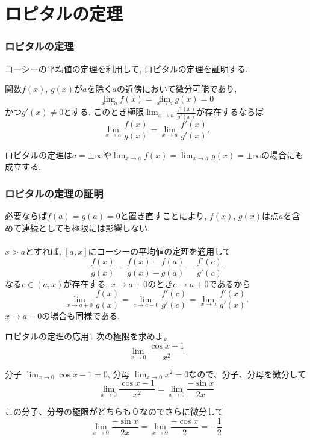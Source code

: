 \section{ロピタルの定理}

\begin{frame}
\frametitle{ロピタルの定理}

コーシーの平均値の定理を利用して, ロピタルの定理を証明する. 

\begin{Thm}[ロピタルの定理]
関数$f(x)$, $g(x)$が$a$を除く$a$の近傍において微分可能であり, 
$$
\lim_{x\to a}f(x) = \lim_{x\to a}g(x)=0
$$
かつ$g'(x) \ne0$とする. このとき極限$\displaystyle \lim_{x\to a}\frac{f'(x)}{g'(x)}$が存在するならば
$$
\lim_{x\to a}\frac{f(x)}{g(x)} = \lim_{x\to a}\frac{f'(x)}{g'(x)}. 
$$
\end{Thm}

ロピタルの定理は$a=\pm \infty$や$\displaystyle \lim_{x\to a}f(x) = \lim_{x\to a}g(x)=\pm \infty$の場合にも成立する. 

\end{frame}





\begin{frame}
\frametitle{ロピタルの定理の証明}
必要ならば$f(a)=g(a)=0$と置き直すことにより, $f(x)$, $g(x)$は点$a$を含めて連続としても極限には影響しない. \\
\ \\

$x>a$とすれば, $[a, x]$にコーシーの平均値の定理を適用して
$$
\frac{f(x)}{g(x)}=
\frac{f(x)-f(a)}{g(x)-g(a)}=
\frac{f'(c)}{g'(c)}
$$
なる$c \in (a,x)$が存在する. 
$x \to a+0$のとき$c \to a +0$であるから
$$
\lim_{x\to a+0}\frac{f(x)}{g(x)}  = \lim_{c \to a+0}\frac{f'(c)}{g'(c)}= \lim_{x\to a}\frac{f'(x)}{g'(x)}. 
$$
$x \to a-0$の場合も同様である. 

\end{frame}
\begin{slide}{ロピタルの定理の応用1}
次の極限を求めよ。
\begin{equation}
\lim_{x \to 0} \frac{\cos{x} - 1}{x^2} \nonumber
\end{equation}
\vspace{5mm}


分子 $\lim_{x\to0} \cos{x} - 1 = 0$, 分母 $\lim_{x\to 0}x^2 = 0$なので、分子、分母を微分して
\begin{equation}
\lim_{x \to 0} \frac{\cos{x} - 1}{x^2} = \lim_{x\to 0} \frac{-\sin{x}}{2x} \nonumber 
\end{equation}

この分子、分母の極限がどちらも０なのでさらに微分して
\begin{equation}
\lim_{x\to 0} \frac{-\sin{x}}{2x}=  \lim_{x\to 0} \frac{-\cos{x}}{2}=-\frac{1}{2}  \nonumber
\end{equation}


\end{slide}


